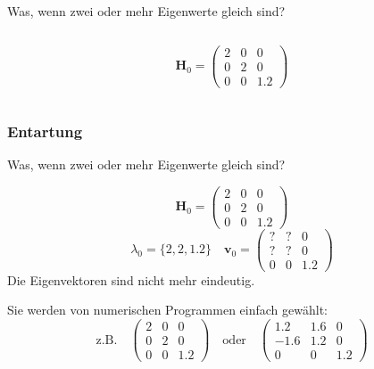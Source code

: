 \documentclass[ngerman, aspectratio=169]{beamer}
\begin{document}
\begin{frame}
\begin{block}{Was, wenn zwei oder mehr Eigenwerte gleich sind?}
\begin{columns}
\begin{column}{0.40\textwidth}
\begin{center}
					\end{center}
					\begin{equation*}
						\bm H_0 = 
						\begin{pmatrix}
							2 & 0 & 0\\
							0 & 2 & 0\\
							0 & 0 & 1.2
						\end{pmatrix}
					\end{equation*}
				\end{column}
			\end{columns}
		\end{block}
	\end{frame}

	\begin{frame}
        \frametitle{Entartung}

		\begin{block}{Was, wenn zwei oder mehr Eigenwerte gleich sind?}

			\begin{equation*}
				\bm H_0 = 
				\begin{pmatrix}
					2 & 0 & 0\\
					0 & 2 & 0\\
					0 & 0 & 1.2
				\end{pmatrix}
			\end{equation*}
			\begin{equation*}
				\lambda_0 = 
				\{
					2, 2, 1.2
				\}
				\quad
				\bm v_0 = 
				\begin{pmatrix}
					? & ? & 0\\
					? & ? & 0\\
					0 & 0 & 1.2
				\end{pmatrix}
			\end{equation*}
			Die Eigenvektoren sind nicht mehr eindeutig.

			Sie werden von numerischen Programmen einfach gewählt:
			\begin{equation*}
				\text{z.B.}
				\quad
				\begin{pmatrix}
					2 & 0 & 0\\
					0 & 2 & 0\\
					0 & 0 & 1.2
				\end{pmatrix}
				\quad
				\text{oder}
				\quad
				\begin{pmatrix}
					1.2 & 1.6 & 0\\
					-1.6 & 1.2 & 0\\
					 0 & 0 & 1.2
				\end{pmatrix}
			\end{equation*}
		\end{block}
	\end{frame}
\end{document}
